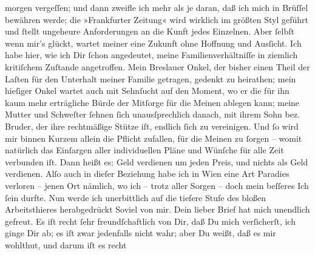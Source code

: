 \begin{ledgroupsized}[t]{13cm}
               morgen vergeſſen; und dann zweifle ich mehr als je daran, daß ich mich in Brüſſel bewähren {\pb}werde; die »Frankfurter Zeitung« wird wirklich
               im größten Styl geführt und ſtellt ungeheure Anforderungen an die Kunft jedes
               Einzelnen. Aber ſelbſt wenn mir’s glückt, wartet meiner eine Zukunft ohne Hoffnung
               und Ausſicht. Ich habe hier,
               wie ich Dir ſchon angedeutet, meine Familienverhältniſſe in ziemlich kritiſchem
               Zuſtande angetroffen. Mein Breslauer Onkel, der bisher einen Theil
               der Laſten für den Unterhalt meiner Familie getragen, gedenkt zu heirathen; mein
               hieſiger Onkel
               wartet auch mit Sehnſucht auf den Moment, wo er die für ihn kaum mehr erträgliche
               Bürde der Mitſorge für die Meinen ablegen kann; meine Mutter und Schweſter ſehnen ſich unausſprechlich
               danach, mit ihrem Sohn bez. Bruder, der ihre rechtmäßige Stütze iſt, endlich ſich {\pb}zu vereinigen. Und ſo wird mir binnen Kurzem allein
               die Pflicht zufallen, für die Meinen zu ſorgen – womit natürlich das Einſargen aller
               individuellen Pläne und Wünſche für alle Zeit verbunden iſt. Dann heißt es: Geld
               verdienen um jeden Preis, und nichts als Geld verdienen. Alſo auch in dieſer
               Beziehung habe ich in Wien eine Art Paradies
               verloren – jenen Ort nämlich, wo
               ich – trotz aller Sorgen – doch mein beſſeres Ich ſein durfte. Nun werde ich
               unerbittlich auf die tiefere Stufe des bloßen Arbeitsthieres herabgedrückt{\dotsfive}\pend
           \pstart
           Soviel von mir. Dein lieber Brief hat mich unendlich gefreut. Es iſt recht ſehr
               freundſchaftlich von Dir, daß Du mich verſicherſt, ich ginge Dir ab; es iſt zwar
               jedenfalls nicht wahr; aber Du weißt, daß es mir wohlthut, und darum iſt es recht

\end{ledgroupsized}
